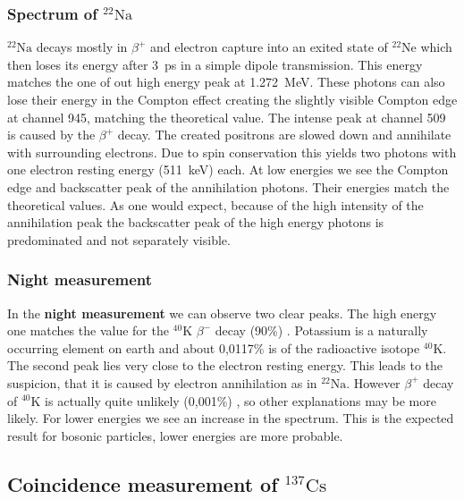 \subsubsection*{Spectrum of $^{22}\text{Na}$}
%
\textbf{$^{22}\text{Na}$} decays mostly in $\beta^{+}$ and electron capture into an exited state of $^{22}\text{Ne}$ which then loses its energy after \SI{3}{\pico\second} in a simple dipole transmission.
This energy matches the one of out high energy peak at \SI{1.272}{\mega\electronvolt}.
These photons can also lose their energy in the Compton effect creating the slightly visible Compton edge at channel 945, matching the theoretical value.
The intense peak at channel 509 is caused by the $\beta^{+}$ decay.
The created positrons are slowed down and annihilate with surrounding electrons.
Due to spin conservation this yields two photons with one electron resting energy (\SI{511}{\kilo\electronvolt}) each.
At low energies we see the Compton edge and backscatter peak of the annihilation photons.
Their energies match the theoretical values.
As one would expect, because of the high intensity of the annihilation peak the backscatter peak of the high energy photons is predominated and not separately visible.
%
\subsubsection*{Night measurement}
%
In the \textbf{night measurement} we can observe two clear peaks.
The high energy one matches the value for the $^{40}\text{K}$ $\beta^{-}$ decay (90\%) \cite{WikiPotassium}.
Potassium is a naturally occurring element on earth and about 0,0117\% is of the radioactive isotope $^{40}\text{K}$.
The second peak lies very close to the electron resting energy.
This leads to the suspicion, that it is caused by electron annihilation as in $^{22}\text{Na}$.
However $\beta^{+}$ decay of $^{40}\text{K}$ is actually quite unlikely (0,001\%) \cite{WikiPotassium}, so other explanations may be more likely.
For lower energies we see an increase in the spectrum.
This is the expected result for bosonic particles, lower energies are more probable.
%
\subsection*{Coincidence measurement of $^{137}\text{Cs}$}
%

